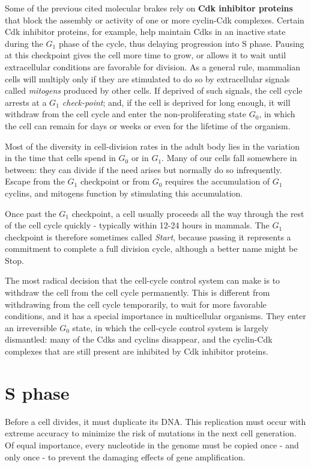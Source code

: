 Some of the previous cited molecular brakes rely on \textbf{Cdk inhibitor proteins} that
block the assembly or activity of one or more cyclin-Cdk complexes.
Certain Cdk inhibitor proteins, for example, help maintain Cdks in an
inactive state during the $G_1$ phase of the cycle, thus delaying progression
into S phase. Pausing at this checkpoint gives the cell more time to
grow, or allows it to wait until extracellular conditions are favorable for
division. As a general rule, mammalian cells will multiply only if they are
stimulated to do so by extracellular signals called \textit{mitogens} produced by
other cells. If deprived of such signals, the cell cycle arrests at a \textit{$G_1$
check-point}; and, if the cell is deprived for long enough, it will
withdraw from the cell cycle and enter the non-proliferating state $G_0$, in
which the cell can remain for days or weeks or even for the lifetime of the
organism.

Most of the diversity in cell-division rates in the adult body lies in the variation
in the time that cells spend in $G_0$ or in $G_1$. Many of our cells fall somewhere in between: they
can divide if the need arises but normally do so infrequently. Escape from
the $G_1$ checkpoint or from $G_0$ requires the accumulation of $G_1$ cyclins, and
mitogens function by stimulating this accumulation.

Once past the $G_1$ checkpoint, a cell usually proceeds all the way through
the rest of the cell cycle quickly - typically within 12-24 hours in mammals.
The $G_1$ checkpoint is therefore sometimes called \textit{Start}, because
passing it represents a commitment to complete a full division cycle,
although a better name might be Stop.

The most radical decision that the cell-cycle control system can make is
to withdraw the cell from the cell cycle permanently. This is different from
withdrawing from the cell cycle temporarily, to wait for more favorable
conditions, and it has a special importance in multicellular organisms.
They enter an irreversible $G_0$ state, in which the cell-cycle control system is largely dismantled:
many of the Cdks and cyclins disappear, and the cyclin-Cdk complexes
that are still present are inhibited by Cdk inhibitor proteins.

\section{S phase}

Before a cell divides, it must duplicate its DNA.
This replication must occur with extreme accuracy to minimize the risk of
mutations in the next cell generation. Of equal importance, every nucleotide
in the genome must be copied once - and only once - to prevent
the damaging effects of gene amplification.


